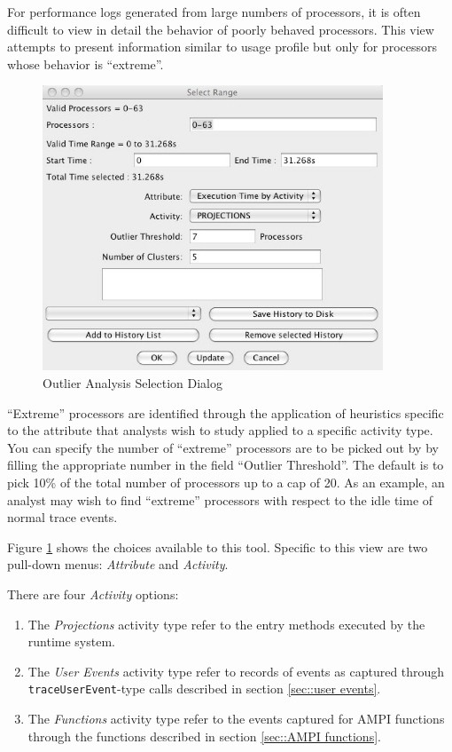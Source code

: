 \label{sec::outlier}

For performance logs generated from large numbers of processors, it is
often difficult to view in detail the behavior of poorly behaved
processors. This view attempts to present information similar to usage
profile but only for processors whose behavior is ``extreme''.

\begin{figure}[htb]
\center
\includegraphics[width=4.0in]{fig/outlier_dialog}
\caption{Outlier Analysis Selection Dialog}
\label{outlier dialog}
\end{figure}

``Extreme'' processors are identified through the application of
heuristics specific to the attribute that analysts wish to study
applied to a specific activity type. You can specify the number of
``extreme'' processors are to be picked out by \projections{} by
filling the appropriate number in the field ``Outlier Threshold''. The
default is to pick 10\% of the total number of processors up to a cap
of 20. As an example, an analyst may wish to find ``extreme''
processors with respect to the idle time of normal \charmpp{} trace
events.

Figure \ref{outlier dialog} shows the choices available to this
tool. Specific to this view are two pull-down menus: {\em Attribute}
and {\em Activity}.

There are four {\em Activity} options:
\begin{enumerate}
\item The {\em Projections} activity type refer to the entry methods 
executed by the \charmpp{} runtime system.
\item The {\em User Events} activity type refer to records of events
as captured through {\tt traceUserEvent}-type calls described in
section \ref{sec::user events}.
\item The {\em Functions} activity type refer to the events captured
for AMPI functions through the functions described in section
\ref{sec::AMPI functions}.
\end{enumerate}

